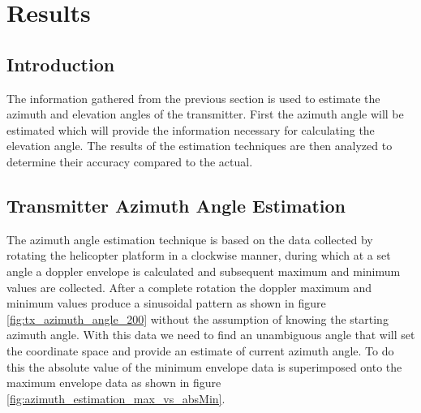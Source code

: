 \chapter{Results} \label{ch:results}

\section{Introduction}
The information gathered from the previous section is used to estimate the azimuth and elevation angles of the transmitter. First the azimuth angle will be estimated which will provide the information necessary for calculating the elevation angle. The results of the estimation techniques are then analyzed to determine their accuracy compared to the actual.


\section{Transmitter Azimuth Angle Estimation} \label{sec:transmitter_azimuth_angle_estimation}
The azimuth angle estimation technique is based on the data collected by rotating the helicopter platform in a clockwise manner, during which at a set angle a doppler envelope is calculated and subsequent maximum and minimum values are collected. After a complete rotation the doppler maximum and minimum values produce a sinusoidal pattern as shown in figure \ref{fig:tx_azimuth_angle_200} without the assumption of knowing the starting azimuth angle. With this data we need to find an unambiguous angle that will set the coordinate space and provide an estimate of current azimuth angle. To do this the absolute value of the minimum envelope data is superimposed onto the maximum envelope data as shown in figure \ref{fig:azimuth_estimation_max_vs_absMin}.

